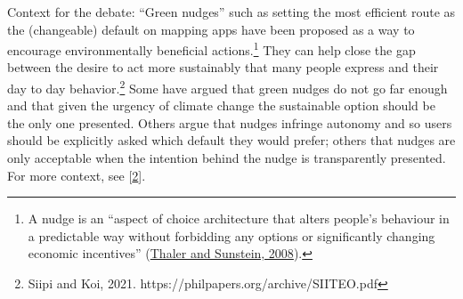 \begin{enumerate}
Context for the debate: “Green nudges” such as setting the most efficient route as the (changeable) default on mapping apps have been proposed as a way to encourage environmentally beneficial actions.\footnote{A nudge is an “aspect of  choice architecture that alters people’s behaviour in a predictable way without forbidding any options or significantly changing economic incentives” (\href{https://psycnet.apa.org/record/2008-03730-000}{Thaler and Sunstein, 2008}).}  They can help close the gap between the desire to act more sustainably that many people express and their day to day behavior.\footnote{\label{note2}Siipi and Koi, 2021. https://philpapers.org/archive/SIITEO.pdf}  Some have argued that green nudges do not go far enough and that given the urgency of climate change the sustainable option should be the only one presented. Others argue that nudges infringe autonomy and so users should be explicitly asked which default they would prefer; others that nudges are only acceptable when the intention behind the nudge is transparently presented. For more context, see [\ref{note2}].
\end{enumerate}
